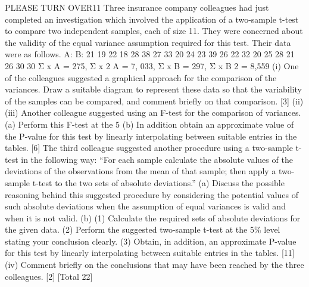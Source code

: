 \documentclass[a4paper,12pt]{article}
\begin{document}
\begin{enumerate}
PLEASE TURN OVER11
Three insurance company colleagues had just completed an investigation which
involved the application of a two-sample t-test to compare two independent samples, each of size 11. They were concerned about the validity of the equal variance assumption required for this test. Their data were as follows.
A:
B:
21
19
22
18
28
38
27
33
20
24
23
39
26
22
32
20
25
28
21
26
30
30
Σ x A = 275, Σ x 2 A = 7, 033, Σ x B = 297, Σ x B 2 = 8,559
(i)
One of the colleagues suggested a graphical approach for the comparison of the variances.
Draw a suitable diagram to represent these data so that the variability of the samples can be compared, and comment briefly on that comparison.
[3]
(ii)
(iii)
Another colleague suggested using an F-test for the comparison of variances.
(a) Perform this F-test at the 5%
(b) In addition obtain an approximate value of the P-value for this test by linearly interpolating between suitable entries in the tables.
[6]
The third colleague suggested another procedure using a two-sample t-test in the following way:
“For each sample calculate the absolute values of the deviations of the observations from the mean of that sample;
then apply a two-sample t-test to the two sets of absolute deviations.”
(a) Discuss the possible reasoning behind this suggested procedure by considering the potential values of such absolute deviations when the assumption of equal variances is valid and when it is not valid.
(b) (1) Calculate the required sets of absolute deviations for the given
data.
(2) Perform the suggested two-sample t-test at the 5\% level stating your conclusion clearly.
(3) Obtain, in addition, an approximate P-value for this test by linearly interpolating between suitable entries in the tables.
[11]
(iv)
Comment briefly on the conclusions that may have been reached by the three
colleagues.
[2]
[Total 22]



\end{enumerate}
\end{document}
